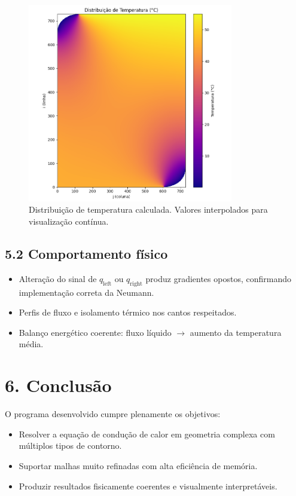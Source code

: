 \documentclass[12pt]{article}
\begin{document}
\begin{figure}[H]
    \centering
    \includegraphics[width=0.8\textwidth]{img/Figure_1.png}
    \caption{Distribuição de temperatura calculada. Valores interpolados para visualização contínua.}
\end{figure}

\subsection*{5.2 Comportamento físico}

\begin{itemize}
    \item Alteração do sinal de $q_{\text{left}}$ ou $q_{\text{right}}$ produz gradientes opostos, confirmando implementação correta da Neumann.
    \item Perfis de fluxo e isolamento térmico nos cantos respeitados.
    \item Balanço energético coerente: fluxo líquido $\rightarrow$ aumento da temperatura média.
\end{itemize}

\section*{6. Conclusão}

O programa desenvolvido cumpre plenamente os objetivos:
\begin{itemize}
    \item Resolver a equação de condução de calor em geometria complexa com múltiplos tipos de contorno.
    \item Suportar malhas muito refinadas com alta eficiência de memória.
    \item Produzir resultados fisicamente coerentes e visualmente interpretáveis.
\end{itemize}
\end{document}
